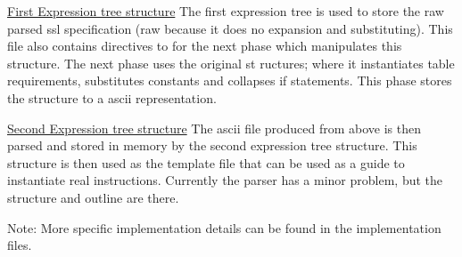 \underline{First Expression tree structure}
The first expression tree is used to store the raw parsed ssl
specification (raw because it does no expansion and substituting). This
file also contains directives to for the next phase which manipulates this
structure. The next phase uses the original st ructures; where it
instantiates table requirements, substitutes constants and collapses if
statements. This phase stores the structure to a ascii representation. 


\underline{Second Expression tree structure}
The ascii file produced from above is then parsed and stored in memory by
the second expression tree structure. This structure is then used as the
template file that can be used as a guide to instantiate real
instructions.  Currently the parser has a minor problem, but the structure
and outline are there.

Note: More specific implementation details can be found in the
implementation files. 


